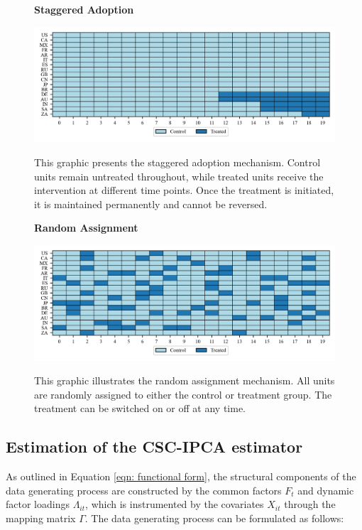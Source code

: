 \documentclass[12pt]{article}
\begin{document}
\begin{figure}[!ht]
\centering
\caption{\textbf{Staggered Adoption}}
\includegraphics{figs/staggered_adoption.png}
\label{app: staggered adoption}
\caption*{\footnotesize{This graphic presents the staggered adoption mechanism. Control units remain untreated throughout, while treated units receive the intervention at different time points. Once the treatment is initiated, it is maintained permanently and cannot be reversed.}}
\end{figure}

\begin{figure}[!ht]
\centering
\caption{\textbf{Random Assignment}}
\includegraphics{figs/random_assignment.png}
\label{app: random assignment}
\caption*{\footnotesize{This graphic illustrates the random assignment mechanism. All units are randomly assigned to either the control or treatment group. The treatment can be switched on or off at any time.}}
\end{figure}

\subsection{Estimation of the CSC-IPCA estimator}
\label{sec: appendix estimation}
As outlined in Equation \ref{eqn: functional form}, the structural components of the data generating process are constructed by the common factors $F_t$ and dynamic factor loadings $\Lambda_{it}$, which is instrumented by the covariates $X_{it}$ through the mapping matrix $\Gamma$. The data generating process can be formulated as follows:
\end{document}
